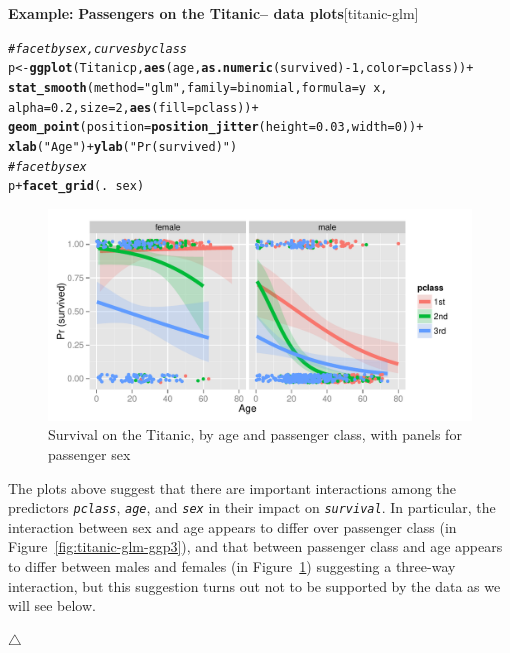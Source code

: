\documentclass{article}
\makeatletter
\newcommand{\hlnum}[1]{\textcolor[rgb]{0.686,0.059,0.569}{#1}}%
\newcommand{\hlstr}[1]{\textcolor[rgb]{0.192,0.494,0.8}{#1}}%
\newcommand{\hlcom}[1]{\textcolor[rgb]{0.678,0.584,0.686}{\textit{#1}}}%
\newcommand{\hlopt}[1]{\textcolor[rgb]{0,0,0}{#1}}%
\newcommand{\hlstd}[1]{\textcolor[rgb]{0.345,0.345,0.345}{#1}}%
\newcommand{\hlkwb}[1]{\textcolor[rgb]{0.69,0.353,0.396}{#1}}%
\newcommand{\hlkwc}[1]{\textcolor[rgb]{0.333,0.667,0.333}{#1}}%
\newcommand{\hlkwd}[1]{\textcolor[rgb]{0.737,0.353,0.396}{\textbf{#1}}}%
\newenvironment{kframe}{%
 \def\at@end@of@kframe{}%
 \ifinner\ifhmode%
  \def\at@end@of@kframe{\end{minipage}}%
  \begin{minipage}{\columnwidth}%
 \fi\fi%
 \def\FrameCommand##1{\hskip\@totalleftmargin \hskip-\fboxsep
 \colorbox{shadecolor}{##1}\hskip-\fboxsep
     \hskip-\linewidth \hskip-\@totalleftmargin \hskip\columnwidth}%
 \MakeFramed {\advance\hsize-\width
   \@totalleftmargin\z@ \linewidth\hsize
   \@setminipage}}%
 {\par\unskip\endMakeFramed%
 \at@end@of@kframe}
\newenvironment{knitrout}{}{} %
\newcommand{\figref}[1]{Figure~\ref{#1}}
\newcommand{\var}[1]{\textit{\texttt{#1}}}
\newenvironment{Example}[2][unnamed-example]%
  {\medskip\noindent\textbf{\textsf{Example:}}
   \textbf{#2}\hfill [#1]\par\smallskip
  }
  {\hfill $\triangle$}
\makeatother
\begin{document}
\begin{Example}[titanic-glm]{Passengers on the Titanic-- data plots}
\begin{knitrout}
\color{fgcolor}\begin{kframe}
\begin{alltt}
\hlcom{# facet by sex, curves by class}
\hlstd{p} \hlkwb{<-} \hlkwd{ggplot}\hlstd{(Titanicp,} \hlkwd{aes}\hlstd{(age,} \hlkwd{as.numeric}\hlstd{(survived)}\hlopt{-}\hlnum{1}\hlstd{,} \hlkwc{color}\hlstd{=pclass))} \hlopt{+}
  \hlkwd{stat_smooth}\hlstd{(}\hlkwc{method}\hlstd{=}\hlstr{"glm"}\hlstd{,} \hlkwc{family}\hlstd{=binomial,} \hlkwc{formula}\hlstd{=y}\hlopt{~}\hlstd{x,}
              \hlkwc{alpha}\hlstd{=}\hlnum{0.2}\hlstd{,} \hlkwc{size}\hlstd{=}\hlnum{2}\hlstd{,} \hlkwd{aes}\hlstd{(}\hlkwc{fill}\hlstd{=pclass))} \hlopt{+}
  \hlkwd{geom_point}\hlstd{(}\hlkwc{position}\hlstd{=}\hlkwd{position_jitter}\hlstd{(}\hlkwc{height}\hlstd{=}\hlnum{0.03}\hlstd{,} \hlkwc{width}\hlstd{=}\hlnum{0}\hlstd{))} \hlopt{+}
        \hlkwd{xlab}\hlstd{(}\hlstr{"Age"}\hlstd{)} \hlopt{+} \hlkwd{ylab}\hlstd{(}\hlstr{"Pr (survived)"}\hlstd{)}
\hlcom{# facet by sex}
\hlstd{p} \hlopt{+} \hlkwd{facet_grid}\hlstd{(.} \hlopt{~} \hlstd{sex)}
\end{alltt}
\end{kframe}\begin{figure}[hbt!]


{\centering \includegraphics[width=\linewidth]{figure/titanic-glm-ggp4} 

}

\caption[Survival on the Titanic, by age and passenger class, with panels for passenger sex]{Survival on the Titanic, by age and passenger class, with panels for passenger sex\label{fig:titanic-glm-ggp4}}
\end{figure}


\end{knitrout}


The plots above suggest that there are important interactions among the
predictors \var{pclass}, \var{age}, and \var{sex} in their impact on
\var{survival}. In particular, the interaction between 
sex and age appears to differ over passenger class (in \figref{fig:titanic-glm-ggp3}),
and that between passenger class
and age appears to differ between males and females (in \figref{fig:titanic-glm-ggp4})
suggesting a three-way interaction, but this suggestion turns out not to
be supported by the data as we will see below.


\end{Example}
\end{document}
